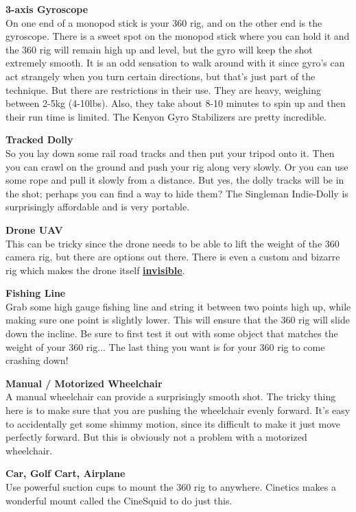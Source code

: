 \begin{fullwidth}
{\bf 3-axis Gyroscope}
\\
On one end of a monopod stick is your 360 rig, and on the other end is the gyroscope. There is a sweet spot on the monopod stick where you can hold it and the 360 rig will remain high up and level, but the gyro will keep the shot extremely smooth. It is an odd sensation to walk around with it since gyro's can act strangely when you turn certain directions, but that's just part of the technique. But there are restrictions in their use. They are heavy, weighing between 2-5kg (4-10lbs). Also, they take about 8-10 minutes to spin up and then their run time is limited. The Kenyon Gyro Stabilizers are pretty incredible.

{\bf Tracked Dolly}
\\
So you lay down some rail road tracks and then put your tripod onto it. Then you can crawl on the ground and push your rig along very slowly. Or you can use some rope and pull it slowly from a distance. But yes, the dolly tracks will be in the shot; perhaps you can find a way to hide them? The Singleman Indie-Dolly is surprisingly affordable and is very portable. 

{\bf Drone UAV}
\\
This can be tricky since the drone needs to be able to lift the weight of the 360 camera rig, but there are options out there. There is even a custom and bizarre rig which makes the drone itself \textbf{\href{youtu.be/-5iUZybKXr0}{invisible}}.

{\bf Fishing Line}
\\
Grab some high gauge fishing line and string it between two points high up, while making sure one point is slightly lower. This will ensure that the 360 rig will slide down the incline. Be sure to first test it out with some object that matches the weight of your 360 rig... The last thing you want is for your 360 rig to come crashing down!

{\bf Manual / Motorized Wheelchair}
\\
A manual wheelchair can provide a surprisingly smooth shot. The tricky thing here is to make sure that you are pushing the wheelchair evenly forward. It's easy to accidentally get some shimmy motion, since its difficult to make it just move perfectly forward. But this is obviously not a problem with a motorized wheelchair. 

{\bf Car, Golf Cart, Airplane}
\\
Use powerful suction cups to mount the 360 rig to anywhere. Cinetics makes a wonderful mount called the CineSquid to do just this.





\clearpage
\end{fullwidth}
